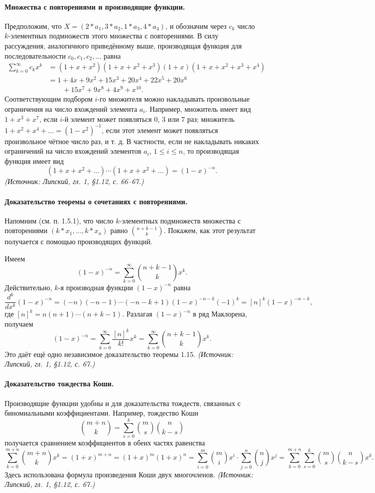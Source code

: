 \documentclass[a4paper,12pt]{article}
\begin{document}
\paragraph{Множества с повторениями и производящие функции.}
Предположим, что \(X=(2*a_1,3*a_2,1*a_3,4*a_4)\), и обозначим через \(c_k\) число \(k\)-элементных подмножеств этого множества с повторениями. В силу рассуждения, аналогичного приведённому выше, производящая функция для последовательности \(c_0,c_1,c_2,\dots\) равна
\[
\begin{aligned}
\sum_{k=0}^{\infty}c_kx^k
&=(1+x+x^2)(1+x+x^2+x^3)(1+x)(1+x+x^2+x^3+x^4)\\
&=1+4x+9x^2+15x^3+20x^4+22x^5+20x^6\\
&\qquad+15x^7+9x^8+4x^9+x^{10}.
\end{aligned}
\]
Соответствующим подбором \(i\)-го множителя можно накладывать произвольные ограничения на число вхождений элемента \(a_i\). Например, множитель имеет вид \(1+x^3+x^7\), если \(i\)-й элемент может появляться \(0\), \(3\) или \(7\) раз; множитель \(1+x^2+x^4+\dots=(1-x^2)^{-1}\), если этот элемент может появляться произвольное чётное число раз, и т. д. В частности, если не накладывать никаких ограничений на число вхождений элементов \(a_i\), \(1\le i\le n\), то производящая функция имеет вид
\[
(1+x+x^2+\dots)\cdots(1+x+x^2+\dots)=(1-x)^{-n}.
\]
\textit{(Источник: Липский, гл. 1, §1.12, с. 66--67.)}

\paragraph{Доказательство теоремы о сочетаниях с повторениями.}
Напомним (см. п. 1.5.1), что число \(k\)-элементных подмножеств множества с повторениями \((k*x_1,\dots,k*x_n)\) равно \(\binom{n+k-1}{k}\). Покажем, как этот результат получается с помощью производящих функций.

Имеем
\[
(1-x)^{-n}=\sum_{k=0}^{\infty}\binom{n+k-1}{k}x^k.
\]
Действительно, \(k\)-я производная функции \((1-x)^{-n}\) равна
\[
\frac{d^k}{dx^k}(1-x)^{-n}=(-n)(-n-1)\cdots(-n-k+1)(1-x)^{-n-k}(-1)^k=[n]^k(1-x)^{-n-k},
\]
где \([n]^k=n(n+1)\cdots(n+k-1)\). Разлагая \((1-x)^{-n}\) в ряд Маклорена, получаем
\[
(1-x)^{-n}=\sum_{k=0}^{\infty}\frac{[n]^k}{k!}x^k=\sum_{k=0}^{\infty}\binom{n+k-1}{k}x^k.
\]
Это даёт ещё одно независимое доказательство теоремы 1.15.
\textit{(Источник: Липский, гл. 1, §1.12, с. 67.)}

\paragraph{Доказательство тождества Коши.}
Производящие функции удобны и для доказательства тождеств, связанных с биномиальными коэффициентами. Например, тождество Коши
\[
\binom{m+n}{k}=\sum_{s=0}^{k}\binom{m}{s}\binom{n}{k-s}
\]
получается сравнением коэффициентов в обеих частях равенства
\[
\sum_{k=0}^{m+n}\binom{m+n}{k}x^k=(1+x)^{m+n}=(1+x)^m(1+x)^n
=\sum_{i=0}^{m}\binom{m}{i}x^i\cdot\sum_{j=0}^{n}\binom{n}{j}x^j
=\sum_{k=0}^{m+n}\sum_{s=0}^{k}\binom{m}{s}\binom{n}{k-s}x^k.
\]
Здесь использована формула произведения Коши двух многочленов.
\textit{(Источник: Липский, гл. 1, §1.12, с. 67.)}
\end{document}
